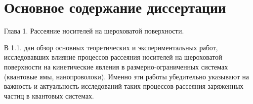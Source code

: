 \newcommand{\actuality}{\underline{\textbf{\actualityTXT}}}
\newcommand{\progress}{\underline{\textbf{\progressTXT}}}
\newcommand{\aim}{\underline{{\textbf\aimTXT}}}
\newcommand{\tasks}{\underline{\textbf{\tasksTXT}}}
\newcommand{\novelty}{\underline{\textbf{\noveltyTXT}}}
\newcommand{\influence}{\underline{\textbf{\influenceTXT}}}
\newcommand{\methods}{\underline{\textbf{\methodsTXT}}}
\newcommand{\defpositions}{\underline{\textbf{\defpositionsTXT}}}
\newcommand{\reliability}{\underline{\textbf{\reliabilityTXT}}}
\newcommand{\probation}{\underline{\textbf{\probationTXT}}}
\newcommand{\contribution}{\underline{\textbf{\contributionTXT}}}
\newcommand{\publications}{\underline{\textbf{\publicationsTXT}}}



\section*{Основное содержание диссертации}

Глава 1. Рассеяние носителей на шероховатой поверхности.

В 1.1. дан обзор основных теоретических и экспериментальных работ, исследовавших влияние процессов рассеяния носителей на шероховатой поверхности на кинетические явления в размерно-ограниченных системах (квантовые ямы, нанопроволоки). Именно эти работы убедительно указывают на важность и актуальность исследований таких процессов рассеяния заряженных частиц в квантовых системах.

